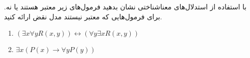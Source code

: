 با استفاده از استدلال‌های معناشناختی نشان بدهید فرمول‌های زیر معتبر هستند یا نه. برای فرمول‌هایی که معتبر نیستند مدل نقض ارائه کنید.
\begin{enumerate}
\item
$(\exists x\forall y R(x,y))\leftrightarrow(\forall y \exists x R(x,y))$
\item
$\exists x(P(x)\to \forall y P(y))$
\end{enumerate}